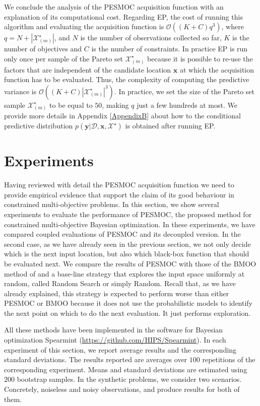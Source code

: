 We conclude the analysis of the PESMOC acquisition function with an explanation of its computational cost. Regarding EP, the cost of running this algorithm and evaluating the acquisition function is $\mathcal{O}((K+C)q^3)$,
where $q = N + |\mathcal{X}_{(m)}^{\star}|$, and $N$ is the number of observations collected so far,
$K$ is the number of objectives and $C$ is the number of constraints.
In practice EP is run only once per sample of the Pareto set $\mathcal{X}_{(m)}^{\star}$ because
it is possible to re-use the factors that are independent of the candidate location $\mathbf{x}$ at which the acquisition
function has to be evaluated. Thus, the complexity of computing the predictive variance is
$\mathcal{O}((K+C)|\mathcal{X}_{(m)}^{\star}|^3)$. In practice, we set the size of the Pareto set
sample $\mathcal{X}_{(m)}^{\star}$ to be equal to $50$, making $q$ just a few hundreds at most.
We provide more details in Appendix \ref{AppendixB} about how
to the conditional predictive distribution $p(\textbf{y}|\mathcal{D}, \textbf{x}, \mathcal{X}^{\star})$
is obtained after running EP.

\section{Experiments}\label{seq_experiments_pesmoc}

Having reviewed with detail the PESMOC acquisition function we need to provide empirical evidence that support the claim of its good behaviour in constrained multi-objective problems. In this section, we show several experiments to evaluate the performance of PESMOC, the proposed method for
constrained multi-objective Bayesian optimization. In these experiments, we have compared coupled evaluations of PESMOC and its decoupled version. In the second case, as we have already seen in the previous section, we not only decide which is the next input
location, but also which black-box function that should be evaluated next. We compare the results of PESMOC with
those of the BMOO method of \cite{feliot2015bayesian} and a base-line strategy that explores the input space
uniformly at random, called Random Search or simply Random. Recall that, as we have already explained, this strategy is expected to perform worse than either PESMOC or BMOO because
it does not use the probabilistic models to identify the next point on which to do the next evaluation. It just 
performs exploration. 

All these methods have been implemented in the software for Bayesian optimization Spearmint (\url{https://github.com/HIPS/Spearmint}).
In each experiment of this section, we report average results and the corresponding standard deviations.
The results reported are averages over $100$ repetitions of the corresponding experiment. Means and standard
deviations are estimated using $200$ bootstrap samples. In the synthetic problems, we consider two scenarios. Concretely, noiseless and noisy observations, and produce results for both of them.

